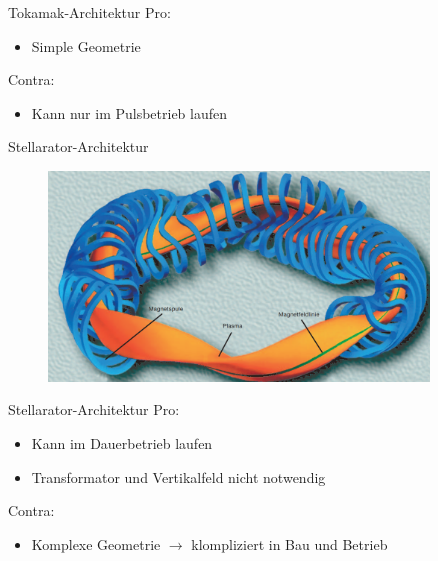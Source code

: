 \documentclass[aspectratio=169,xcolor=dvipsnames,14pt]{beamer}
\begin{document}
    \begin{frame}{Tokamak-Architektur}
        \color{LightGrey}
        Pro:
        \begin{itemize}
            \color{LightGrey}
            \item Simple Geometrie
        \end{itemize}
        Contra:
        \begin{itemize}
            \color{LightGrey}
            \item Kann nur im Pulsbetrieb laufen
        \end{itemize}
    \end{frame}
    \begin{frame}{Stellarator-Architektur}
        \begin{figure}
            \centering
            \includegraphics[width=0.9\textwidth]{Images/Stellarator.png}
        \end{figure}    
    \end{frame}

    \begin{frame}{Stellarator-Architektur}
        \color{LightGrey}
        Pro:
        \begin{itemize}
            \color{LightGrey}
            \item Kann im Dauerbetrieb laufen
            \item Transformator und Vertikalfeld nicht notwendig
        \end{itemize}
        Contra:
        \begin{itemize}
            \color{LightGrey}
            \item Komplexe Geometrie $\to$ klompliziert in Bau und Betrieb
        \end{itemize}
    \end{frame}
\end{document}
